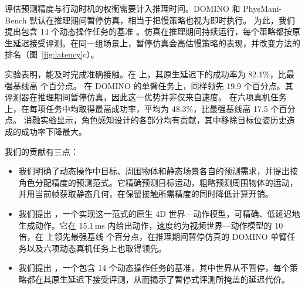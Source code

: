 评估预测精度与行动时机的权衡需要计入推理时间。DOMINO \cite{domino} 和 PhysMani-Bench \cite{physmani} 默认在推理期间暂停仿真，相当于把慢策略也视为即时执行。
为此，我们提出包含 14 个动态操作任务的基准 \textbf{\bench}。仿真在推理期间持续运行，每个策略都按原生延迟接受评测。在同一组场景上，暂停仿真会高估慢策略的表现，并改变方法的排名（图~\ref{fig:latency}c）。

实验表明，\ours 能及时完成准确接触。在 \bench 上，其原生延迟下的成功率为 82.1\%，比最强基线高 \nativeLead{} 个百分点。
在 DOMINO \cite{domino} 的单臂任务上，\ours 同样领先 19.9 个百分点。其评测器在推理期间暂停仿真，因此这一优势并非仅来自速度。
在六项真机任务上，\ours 在每项任务中均取得最高成功率，平均为 48.3\%，比最强基线高 17.5 个百分点。
消融实验显示，角色感知设计的各部分均有贡献，其中移除目标位姿历史造成的成功率下降最大。

我们的贡献有三点：
\begin{itemize}[leftmargin=*,topsep=2pt,itemsep=1pt]
\item 我们明确了动态操作中目标、周围物体和静态场景各自的预测需求，并提出按角色分配精度的预测范式。它精确预测目标运动，粗略预测周围物体的运动，并用当前帧获取静态几何，在保留接触所需精度的同时降低计算开销。
\item 我们提出 \textbf{\ours}，一个实现这一范式的原生 4D 世界—动作模型，可精确、低延迟地生成动作。它在 15.1\,ms 内给出动作，速度约为视频世界—动作模型的 10 倍，在 \bench 上领先最强基线 \nativeLead{} 个百分点，在推理期间暂停仿真的 DOMINO 单臂任务以及六项动态真机任务上也取得领先。
\item 我们提出 \textbf{\bench}，一个包含 14 个动态操作任务的基准，其中世界从不暂停，每个策略都在其原生延迟下接受评测，从而揭示了暂停式评测所掩盖的延迟代价。
\end{itemize}
